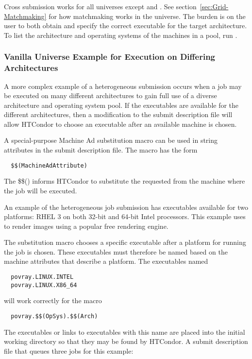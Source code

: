 Cross submission works for all universes except  and
.
See section~\ref{sec:Grid-Matchmaking} for how matchmaking works in the
 universe.
The burden is on the user to both obtain and specify
the correct executable for the target architecture.
To list the architecture and operating systems of the machines
in a pool, run .

\subsubsection{Vanilla Universe Example for Execution on Differing Architectures} 

A more complex example of a heterogeneous submission
occurs when a job may be executed on
many different architectures to gain full
use of a diverse architecture and operating system pool.
If the executables are available for the different architectures,
then a modification to the submit description file
will allow HTCondor to choose an executable after an
available machine is chosen.

A special-purpose Machine Ad substitution macro can be used in
string
attributes in the submit description file.
The macro has the form
\begin{verbatim}
  $$(MachineAdAttribute)
\end{verbatim}
The \$\$() informs HTCondor to substitute the requested 
from the machine where the job will be executed.

An example of the heterogeneous job submission
has executables available for two platforms:
RHEL 3 on both 32-bit and 64-bit Intel processors.
This example uses 
to render images using a popular free rendering engine.

The substitution macro chooses a specific executable after
a platform for running the job is chosen.
These executables must therefore be named based on the
machine attributes that describe a platform.
The executables named \begin{verbatim}
  povray.LINUX.INTEL
  povray.LINUX.X86_64
\end{verbatim}
will work correctly for the macro
\begin{verbatim}
  povray.$$(OpSys).$$(Arch)
\end{verbatim}

The executables or links to executables with this name
are placed into the initial working directory so that they may be
found by HTCondor. 
A submit description file that queues three jobs for this example:

